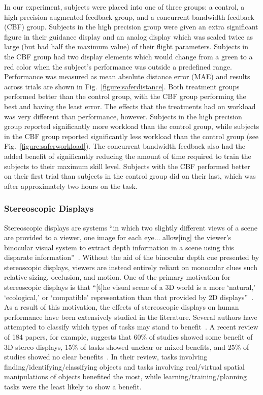 In our experiment, subjects were placed into one of three groups: a control, a high precision augmented feedback group, and a concurrent bandwidth feedback (CBF) group.
Subjects in the high precision group were given an extra significant figure in their guidance display and an analog display which was scaled twice as large (but had half the maximum value) of their flight parameters.
Subjects in the CBF group had two display elements which would change from a green to a red color when the subject's performance was outside a predefined range.
Performance was measured as mean absolute distance error (MAE) and results across trials are shown in Fig.~\ref{figure:saferdistance}.
Both treatment groups performed better than the control group, with the CBF group performing the best and having the least error.
The effects that the treatments had on workload was very different than performance, however.
Subjects in the high precision group reported significantly more workload than the control group, while subjects in the CBF group reported significantly less workload than the control group (see Fig.~\ref{figure:saferworkload}).
The concurrent bandwidth feedback also had the added benefit of significantly reducing the amount of time required to train the subjects to their maximum skill level.
Subjects with the CBF performed better on their first trial than subjects in the control group did on their last, which was after approximately two hours on the task.

\subsubsection{Stereoscopic Displays}
Stereoscopic displays are systems ``in which two slightly different views of a scene are provided to a viewer, one image for each eye... allow[ing] the viewer's binocular visual system to extract depth information in a scene using this disparate information''~\citep{mcintire_stereoscopic_2014}.
Without the aid of the binocular depth cue presented by stereoscopic displays, viewers are instead entirely reliant on monocular clues such relative sizing, occlusion, and motion.
One of the primary motivation for stereoscopic displays is that ``[t]he visual scene of a 3D world is a more `natural,' `ecological,' or `compatible' representation than that provided by 2D displays''~\citep{wickens_three-dimensional_1990}.
As a result of this motivation, the effects of stereoscopic displays on human performance have been extensively studied in the literature.
Several authors have attempted to classify which types of tasks may stand to benefit~\citep{mcintire_stereoscopic_2014, wickens_three-dimensional_1990, wickens_three-dimensional_1989, naikar_perspective_1998, dixon_human_2009}.
A recent review of 184 papers, for example, suggests that 60\% of studies showed some benefit of 3D stereo displays, 15\% of tasks showed unclear or mixed benefits, and 25\% of studies showed no clear benefits~\citep{mcintire_stereoscopic_2014}.
In their review, tasks involving finding/identifying/classifying objects and tasks involving real/virtual spatial manipulations of objects benefited the most, while learning/training/planning tasks were the least likely to show a benefit.

